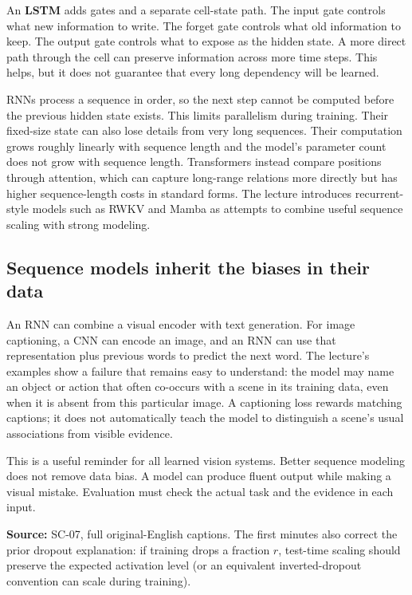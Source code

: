 An \textbf{LSTM} adds gates and a separate cell-state path. The input gate controls what new information to write. The forget gate controls what old information to keep. The output gate controls what to expose as the hidden state. A more direct path through the cell can preserve information across more time steps. This helps, but it does not guarantee that every long dependency will be learned.

RNNs process a sequence in order, so the next step cannot be computed before the previous hidden state exists. This limits parallelism during training. Their fixed-size state can also lose details from very long sequences. Their computation grows roughly linearly with sequence length and the model's parameter count does not grow with sequence length. Transformers instead compare positions through attention, which can capture long-range relations more directly but has higher sequence-length costs in standard forms. The lecture introduces recurrent-style models such as RWKV and Mamba as attempts to combine useful sequence scaling with strong modeling.

\subsection{Sequence models inherit the biases in their data}\label{04-visual-computing-ii-ch031-sequence-models-inherit-the-biases-in-their-data}

\hypertarget{04-visual-computing-ii-ch031-sequence-models-inherit-the-biases-in-their-data}{}

An RNN can combine a visual encoder with text generation. For image captioning, a CNN can encode an image, and an RNN can use that representation plus previous words to predict the next word. The lecture's examples show a failure that remains easy to understand: the model may name an object or action that often co-occurs with a scene in its training data, even when it is absent from this particular image. A captioning loss rewards matching captions; it does not automatically teach the model to distinguish a scene's usual associations from visible evidence.

This is a useful reminder for all learned vision systems. Better sequence modeling does not remove data bias. A model can produce fluent output while making a visual mistake. Evaluation must check the actual task and the evidence in each input.

\textbf{Source:} SC-07, full original-English captions. The first minutes also correct the prior dropout explanation: if training drops a fraction \(r\), test-time scaling should preserve the expected activation level (or an equivalent inverted-dropout convention can scale during training).

